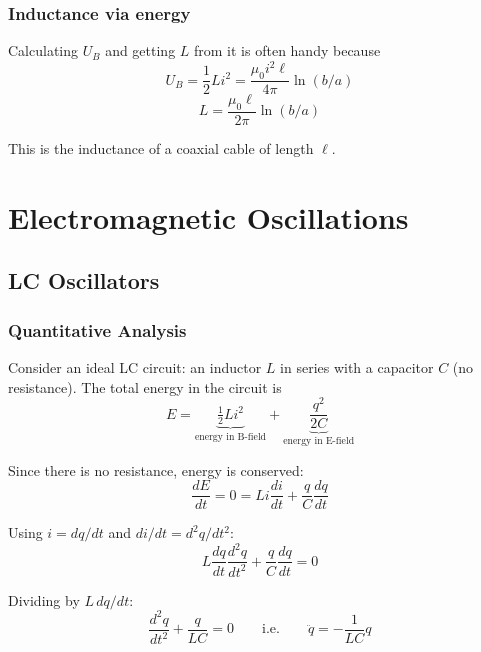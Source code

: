 \documentclass[11pt]{report}
\begin{document}
\subsection*{Inductance via energy}

Calculating $U_B$ and getting $L$ from it is often handy because
\begin{equation}
U_B = \frac{1}{2}Li^2 = \frac{\mu_0 i^2 \ell}{4\pi}\ln(b/a)
\end{equation}
\begin{equation}
\boxed{L = \frac{\mu_0 \ell}{2\pi}\ln(b/a)}
\end{equation}

This is the inductance of a coaxial cable of length $\ell$.


\newpage
\chapter{Electromagnetic Oscillations}

\section{LC Oscillators}

\subsection{Quantitative Analysis}

Consider an ideal LC circuit: an inductor $L$ in series with a capacitor $C$ (no resistance). The total energy in the circuit is
\begin{equation}
E = \underbrace{\tfrac{1}{2}Li^2}_{\text{energy in B-field}} + \underbrace{\frac{q^2}{2C}}_{\text{energy in E-field}}
\end{equation}

Since there is no resistance, energy is conserved:
\begin{equation}
\frac{dE}{dt} = 0 = Li\frac{di}{dt} + \frac{q}{C}\frac{dq}{dt}
\end{equation}

Using $i = dq/dt$ and $di/dt = d^2q/dt^2$:
\begin{equation}
L\frac{dq}{dt}\frac{d^2q}{dt^2} + \frac{q}{C}\frac{dq}{dt} = 0
\end{equation}

Dividing by $L\,dq/dt$:
\begin{equation}
\boxed{\frac{d^2q}{dt^2} + \frac{q}{LC} = 0 \qquad \text{i.e.} \qquad \ddot{q} = -\frac{1}{LC}q}
\end{equation}
\end{document}

